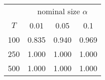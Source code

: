 % 
\begin{tabular}{cccc}
  \hline
  & \multicolumn{3}{c}{nominal size $\alpha$} \\
 $T$ & 0.01 & 0.05 & 0.1 \\
 \hline
100 & 0.835 & 0.940 & 0.969 \\ 
  250 & 1.000 & 1.000 & 1.000 \\ 
  500 & 1.000 & 1.000 & 1.000 \\ 
   \hline
\end{tabular}
